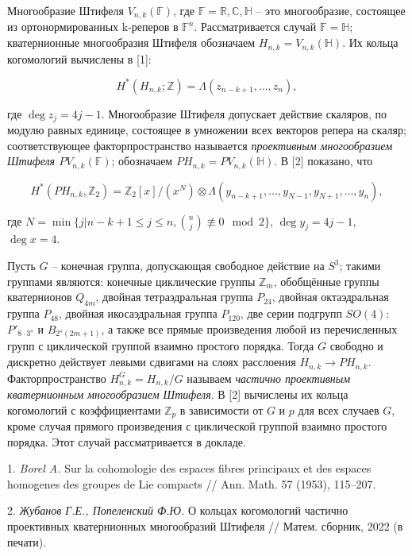 \documentclass{vzmsthesis}
\begin{document}

\vzmscaption

Многообразие Штифеля $V_{n,k}(\mathbb{F})$, где $\mathbb{F} = \mathbb{R}, \mathbb{C}, \mathbb{H}$ -- это многообразие, состоящее из ортонормированных k-реперов в $\mathbb{F}^n$. Рассматривается случай $\mathbb{F} = \mathbb{H}$; кватернионные многообразия Штифеля обозначаем $H_{n,k} = V_{n,k}(\mathbb{H})$. Их кольца когомологий вычислены в [1]:

$$H^*(H_{n,k}; \mathbb{Z}) = \Lambda(z_{n-k+1}, \ldots, z_n),$$

где $\deg z_j = 4j - 1$. Многообразие Штифеля допускает действие скаляров, по модулю равных единице, состоящее в умножении всех векторов репера на скаляр; соответствующее факторпространство называется \emph{проективным многообразием Штифеля $PV_{n,k}(\mathbb{F})$}; обозначаем $PH_{n,k}=PV_{n,k}(\mathbb{H})$. В [2] показано, что

$$H^*(PH_{n,k}, \mathbb{Z}_2) = \mathbb{Z}_2[x]/(x^N) \otimes \Lambda(y_{n-k+1}, \ldots, y_{N-1}, y_{N+1}, \ldots, y_n),$$

где $N = \min \{j | n - k + 1 \leqslant j \leqslant n, \binom{n}{j} \not\equiv 0 \mod 2\}$, $\deg y_j = 4j - 1$, $\deg x = 4$.

Пусть $G$ -- конечная группа, допускающая свободное действие на $S^3$; такими группами являются: конечные циклические группы $\mathbb{Z}_m$, обобщённые группы кватернионов $Q_{4m}$, двойная тетраэдральная группа $P_{24}$, двойная октаэдральная группа $P_{48}$, двойная икосаэдральная группа $P_{120}$, две серии подгрупп $SO(4)$: $P'_{8\cdot3^s}$ и $B_{2^s(2m+1)}$, а также все прямые произведения любой из перечисленных групп с циклической группой взаимно простого порядка. Тогда $G$ свободно и дискретно действует левыми сдвигами на слоях расслоения $H_{n,k} \to PH_{n,k}$. Факторпространство $H^G_{n,k} = H_{n,k}/G$ называем \emph{частично проективным кватернионным многообразием Штифеля}. В [2] вычислены их кольца когомологий с коэффициентами $\mathbb{Z}_p$ в зависимости от $G$ и $p$ для всех случаев $G$, кроме случая прямого произведения с циклической группой взаимно простого порядка. Этот случай рассматривается в докладе.


\litlist

1. \emph{Borel A.} Sur la cohomologie des espaces fibres principaux et des espaces homogenes
des groupes de Lie compacts // Ann. Math. 57 (1953), 115–207.

2. \emph{Жубанов Г.Е., Попеленский Ф.Ю.} О кольцах когомологий частично проективных кватернионных многообразий Штифеля // Матем. сборник, 2022 (в печати).
\end{document}
